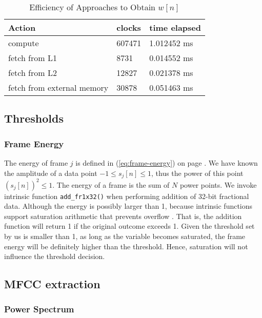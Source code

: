 \begin{table}[H]
\centering
\caption{Efficiency of Approaches to Obtain $w[n]$}
\label{clocks-hamming}
\begin{tabu} to \textwidth {XXX}
\toprule
Action &clocks &time elapsed\\
\hline
compute &607471 &1.012452 ms\\
\hline
fetch from L1 &8731 &0.014552 ms\\
\hline
fetch from L2 &12827 &0.021378 ms\\
\hline
fetch from external memory &30878 &0.051463 ms\\
\bottomrule
\end{tabu}
\end{table}


\subsection{Thresholds}
\label{subsection:dsp-thresholds}
\subsubsection{Frame Energy}

The energy of frame $j$ is defined in (\ref{eq:frame-energy}) on page \pageref{eq:frame-energy}. We have known the amplitude of a data point $-1 \le s_j[n] \le 1$, thus the power of this point $(s_j[n])^2 \le 1$. The energy of a frame is the sum of $N$ power points. We invoke intrinsic function \texttt{add\_fr1x32()} when performing addition of 32-bit fractional data. Although the energy is possibly larger than 1, because intrinsic functions support saturation arithmetic that prevents overflow \cite{gan2007embedded}. That is, the addition function will return 1 if the original outcome exceeds 1. Given the threshold set by us is smaller than 1, as long as the variable becomes saturated, the frame energy will be definitely higher than the threshold. Hence, saturation will not influence the threshold decision.


\subsection{MFCC extraction}
\subsubsection{Power Spectrum}

